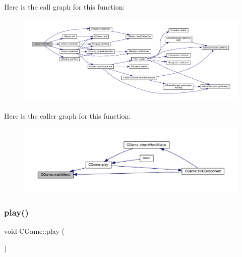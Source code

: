 Here is the call graph for this function\+:\nopagebreak
\begin{figure}[H]
\begin{center}
\leavevmode
\includegraphics[width=350pt]{class_c_game_a39e1e296c6dcabbf5c824eea6424d6d9_cgraph}
\end{center}
\end{figure}
Here is the caller graph for this function\+:\nopagebreak
\begin{figure}[H]
\begin{center}
\leavevmode
\includegraphics[width=350pt]{class_c_game_a39e1e296c6dcabbf5c824eea6424d6d9_icgraph}
\end{center}
\end{figure}
\mbox{\label{class_c_game_aa9d3da2fefa1c04faefc6586dbd37971}} 
\subsubsection{\texorpdfstring{play()}{play()}}
{\footnotesize\ttfamily void C\+Game\+::play (\begin{DoxyParamCaption}{ }\end{DoxyParamCaption})}


